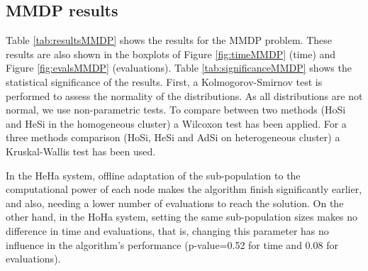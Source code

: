 \subsection{MMDP results}

Table \ref{tab:resultsMMDP} shows the results for the MMDP
problem. These results are also shown in the boxplots of Figure
\ref{fig:timeMMDP} (time) and Figure \ref{fig:evalsMMDP}
(evaluations). Table \ref{tab:significanceMMDP} shows the statistical
significance of the results. First, a Kolmogorov-Smirnov test is
performed to assess the normality of the distributions. As all
distributions are not normal, we use non-parametric tests. To compare
between two methods (HoSi and HeSi in the homogeneous cluster) a
Wilcoxon test has been applied. For a three methods comparison (HoSi,
HeSi and AdSi on heterogeneous cluster) a Kruskal-Wallis test has been
used. %

 In the HeHa system,  offline adaptation of  the sub-population to the computational
 power of each node makes the algorithm finish significantly earlier,
 and also, needing a lower number of evaluations to reach the solution. On the other hand, in the HoHa system,
 setting the same sub-population sizes makes no difference in time and
 evaluations, that is, changing this parameter has no influence in the
 algorithm's performance (p-value=0.52 for time and 0.08 for
 evaluations). %


